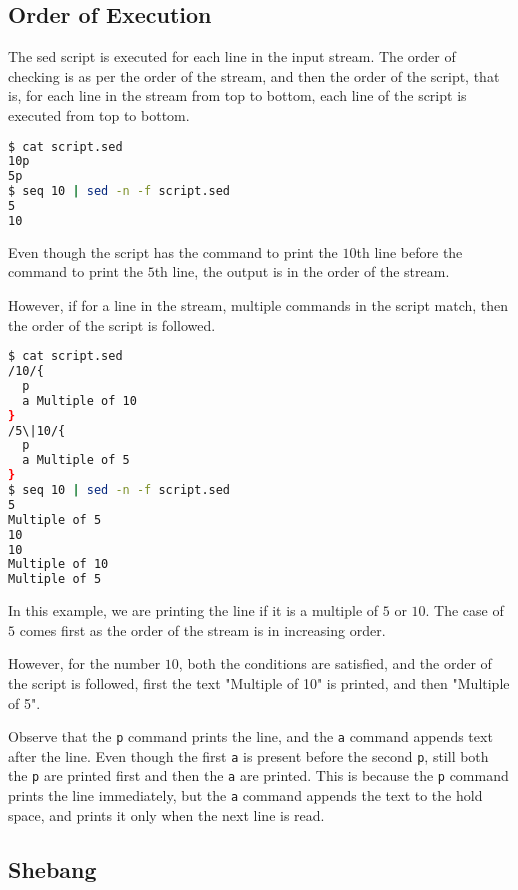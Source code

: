 \subsection{Order of Execution}

The sed script is executed for each line in the input stream.
The order of checking is as per the order of the stream, and then the order of the script, that is, for each line in the stream from top to bottom, each line of the script is executed
from top to bottom.

\begin{lstlisting}[language=bash]
$ cat script.sed
10p
5p
$ seq 10 | sed -n -f script.sed
5
10
\end{lstlisting}

Even though the script has the command to print the $10$th line before the command to print the $5$th line, the output is in the order of the stream.

However, if for a line in the stream, multiple commands in the script match, then the order of the script is followed.

\begin{lstlisting}[language=bash]
$ cat script.sed
/10/{
  p
  a Multiple of 10
}
/5\|10/{
  p
  a Multiple of 5
}
$ seq 10 | sed -n -f script.sed
5
Multiple of 5
10
10
Multiple of 10
Multiple of 5
\end{lstlisting}

In this example, we are printing the line if it is a multiple of $5$ or $10$.
The case of $5$ comes first as the order of the stream is in increasing order.

However, for the number $10$, both the conditions are satisfied, and the order of the script is followed, first the text "Multiple of 10" is printed, and then "Multiple of 5".

\begin{remark}
  Observe that the \lstinline|p| command prints the line, and the \lstinline|a| command appends text after the line. Even though the first \lstinline|a| is present before the second \lstinline|p|, still both the \lstinline|p| are printed first and then the \lstinline|a| are printed.
This is because the \lstinline|p| command prints the line immediately, but the \lstinline|a| command appends the text to the hold space, and prints it only when the next line is read.
\end{remark}

\subsection{Shebang}

